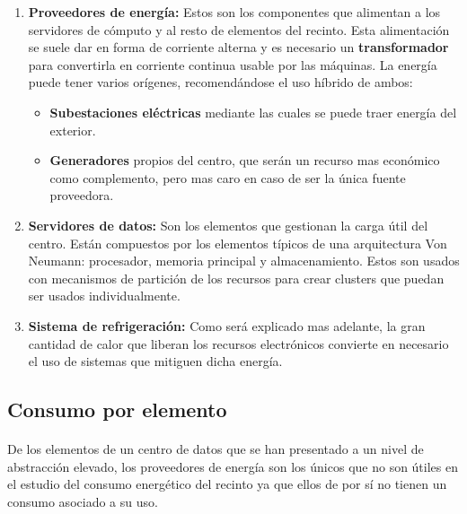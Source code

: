 \documentclass[12pt]{article}
\begin{document}
            \begin{enumerate}
            	\item \textbf{Proveedores de energía:} Estos son los componentes que alimentan a los servidores de cómputo y al resto de elementos del recinto. Esta alimentación se suele dar en forma de corriente alterna y es necesario un \textbf{transformador} para convertirla en corriente continua usable por las máquinas. La energía puede tener varios orígenes, recomendándose el uso híbrido de ambos:
                	\begin{itemize}
                		\item \textbf{Subestaciones eléctricas} mediante las cuales se puede traer energía del exterior.
                        \item \textbf{Generadores} propios del centro, que serán un recurso mas económico como complemento, pero mas caro en caso de ser la única fuente proveedora. 
                	\end{itemize}
                    
                  \item \textbf{Servidores de datos:} Son los elementos que gestionan la carga útil del centro. Están compuestos por los elementos típicos de una arquitectura Von Neumann: procesador, memoria principal y almacenamiento. Estos son usados con mecanismos de partición de los recursos para crear clusters que puedan ser usados individualmente.
                  
                  \item \textbf{Sistema de refrigeración:} Como será explicado mas adelante, la gran cantidad de calor que liberan los recursos electrónicos convierte en necesario el uso de sistemas que mitiguen dicha energía.
            \end{enumerate}
               
   \subsection{Consumo por elemento}
			\paragraph{}
            De los elementos de un centro de datos que se han presentado a un nivel de abstracción elevado, los proveedores de energía son los únicos que no son útiles en el estudio del consumo energético del recinto ya que ellos de por sí no tienen un consumo asociado a su uso.
            
\end{document}
